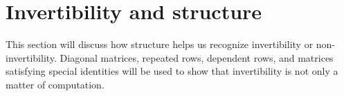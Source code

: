 \section{Invertibility and structure}

This section will discuss how structure helps us recognize invertibility or non-invertibility. Diagonal matrices, repeated rows, dependent rows, and matrices satisfying special identities will be used to show that invertibility is not only a matter of computation.
